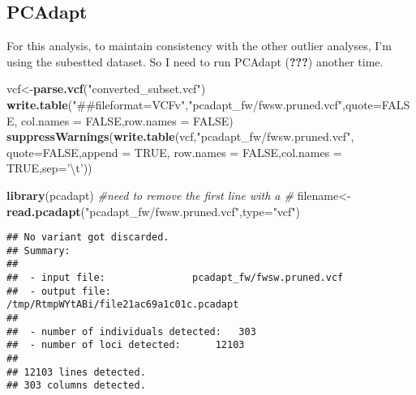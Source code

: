 \documentclass[11pt,]{article}
\newenvironment{Shaded}{\begin{snugshade}}{\end{snugshade}}
\newcommand{\KeywordTok}[1]{\textcolor[rgb]{0.13,0.29,0.53}{\textbf{#1}}}
\newcommand{\DataTypeTok}[1]{\textcolor[rgb]{0.13,0.29,0.53}{#1}}
\newcommand{\CharTok}[1]{\textcolor[rgb]{0.31,0.60,0.02}{#1}}
\newcommand{\StringTok}[1]{\textcolor[rgb]{0.31,0.60,0.02}{#1}}
\newcommand{\CommentTok}[1]{\textcolor[rgb]{0.56,0.35,0.01}{\textit{#1}}}
\newcommand{\OtherTok}[1]{\textcolor[rgb]{0.56,0.35,0.01}{#1}}
\newcommand{\NormalTok}[1]{#1}
\begin{document}
\subsection*{PCAdapt}\label{pcadapt-1}

For this analysis, to maintain consistency with the other outlier
analyses, I'm using the subestted dataset. So I need to run PCAdapt
({\textbf{???}}) another time.

\begin{Shaded}
\begin{Highlighting}[]
\NormalTok{vcf<-}\KeywordTok{parse.vcf}\NormalTok{(}\StringTok{"converted_subset.vcf"}\NormalTok{)}
\KeywordTok{write.table}\NormalTok{(}\StringTok{"##fileformat=VCFv"}\NormalTok{,}\StringTok{"pcadapt_fw/fwsw.pruned.vcf"}\NormalTok{,}\DataTypeTok{quote=}\OtherTok{FALSE}\NormalTok{,}
            \DataTypeTok{col.names =} \OtherTok{FALSE}\NormalTok{,}\DataTypeTok{row.names =} \OtherTok{FALSE}\NormalTok{)}
\KeywordTok{suppressWarnings}\NormalTok{(}\KeywordTok{write.table}\NormalTok{(vcf,}\StringTok{"pcadapt_fw/fwsw.pruned.vcf"}\NormalTok{,}
                             \DataTypeTok{quote=}\OtherTok{FALSE}\NormalTok{,}\DataTypeTok{append =} \OtherTok{TRUE}\NormalTok{,}
                             \DataTypeTok{row.names =} \OtherTok{FALSE}\NormalTok{,}\DataTypeTok{col.names =} \OtherTok{TRUE}\NormalTok{,}\DataTypeTok{sep=}\StringTok{'}\CharTok{\textbackslash{}t}\StringTok{'}\NormalTok{))}
\end{Highlighting}
\end{Shaded}

\begin{Shaded}
\begin{Highlighting}[]
\KeywordTok{library}\NormalTok{(pcadapt)}
\CommentTok{#need to remove the first line with a # }
\NormalTok{filename<-}\KeywordTok{read.pcadapt}\NormalTok{(}\StringTok{"pcadapt_fw/fwsw.pruned.vcf"}\NormalTok{,}\DataTypeTok{type=}\StringTok{"vcf"}\NormalTok{) }
\end{Highlighting}
\end{Shaded}

\begin{verbatim}
## No variant got discarded.
## Summary:
## 
##  - input file:               pcadapt_fw/fwsw.pruned.vcf
##  - output file:              /tmp/RtmpWYtABi/file21ac69a1c01c.pcadapt
## 
##  - number of individuals detected:   303
##  - number of loci detected:      12103
## 
## 12103 lines detected.
## 303 columns detected.
\end{verbatim}
\end{document}
